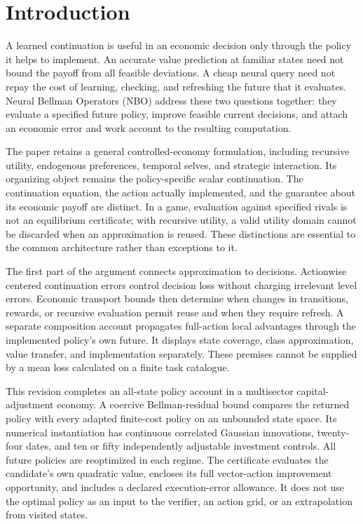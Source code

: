 \section{Introduction}\label{sec:introduction}
A learned continuation is useful in an economic decision only through the
policy it helps to implement. An accurate value prediction at familiar
states need not bound the payoff from all feasible deviations. A cheap
neural query need not repay the cost of learning, checking, and refreshing
the future that it evaluates. Neural Bellman Operators (NBO) address these
two questions together: they evaluate a specified future policy, improve
feasible current decisions, and attach an economic error and work account
to the resulting computation.

The paper retains a general controlled-economy formulation, including
recursive utility, endogenous preferences, temporal selves, and strategic
interaction. Its organizing object remains the policy-specific scalar
continuation. The continuation equation, the action actually implemented,
and the guarantee about its economic payoff are distinct. In a game,
evaluation against specified rivals is not an equilibrium certificate; with
recursive utility, a valid utility domain cannot be discarded when an
approximation is reused. These distinctions are essential to the common
architecture rather than exceptions to it.

The first part of the argument connects approximation to decisions.
Actionwise centered continuation errors control decision loss without
charging irrelevant level errors. Economic transport bounds then determine
when changes in transitions, rewards, or recursive evaluation permit reuse
and when they require refresh. A separate composition account propagates
full-action local advantages through the implemented policy's own future.
It displays state coverage, class approximation, value transfer, and
implementation separately. These premises cannot be supplied by a mean
loss calculated on a finite task catalogue.

This revision completes an all-state policy account in a multisector
capital-adjustment economy. A coercive Bellman-residual bound compares the
returned policy with every adapted finite-cost policy on an unbounded state
space. Its numerical instantiation has continuous correlated Gaussian
innovations, twenty-four dates, and ten or fifty independently adjustable
investment controls. All future policies are reoptimized in each regime.
The certificate evaluates the candidate's own quadratic value, encloses its
full vector-action improvement opportunity, and includes a declared
execution-error allowance. It does not use the optimal policy as an input
to the verifier, an action grid, or an extrapolation from visited states.

